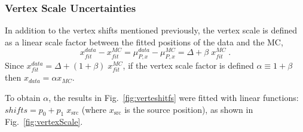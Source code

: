 \subsubsection{Vertex Scale Uncertainties}

In addition to the vertex shifts mentioned previously, the vertex scale is defined as a linear scale factor between the fitted positions of the data and the MC,
\begin{equation}
x^{data}_{fit}-x^{MC}_{fit}=\mu^{data}_{P,x}-\mu^{MC}_{P,x}=\Delta + \beta \; x^{MC}_{fit} \; .
\end{equation}
Since $x^{data}_{fit}=\Delta + (1+\beta) \; x^{MC}_{fit}$, if the vertex scale factor is defined $\alpha\equiv 1+\beta$ then $x_{data}=\alpha x_{MC}$. %

To obtain $\alpha$, the results in Fig.~\ref{fig:verteshitfs} were fitted with linear functions: $shifts = p_0+p_1 \; x_\mathrm{src}$ (where $x_\mathrm{src}$ is the source position), as shown in Fig.~\ref{fig:vertexScale}. %

